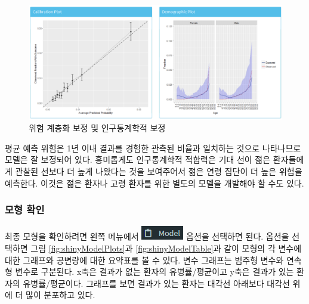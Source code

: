 \documentclass[11pt]{book}
\theoremstyle{definition}
\theoremstyle{definition}
\theoremstyle{definition}
\theoremstyle{remark}
\begin{document}
\begin{figure}

{\centering \includegraphics[width=1\linewidth]{images/PatientLevelPrediction/shiny/shinyPerformanceCal} 

}

\caption{위험 계층화 보정 및 인구통계학적 보정}\label{fig:shinyPerformanceCal}
\end{figure}

평균 예측 위험은 1년 이내 결과를 경험한 관측된 비율과 일치하는 것으로
나타나므로 모델은 잘 보정되어 있다. 흥미롭게도 인구통계학적 적합력은
기대 선이 젊은 환자들에게 관찰된 선보다 더 높게 나왔다는 것을 보여주어서
젊은 연령 집단이 더 높은 위험을 예측한다. 이것은 젊은 환자나 고령 환자를
위한 별도의 모델을 개발해야 할 수도 있다.

\subsubsection*{모형 확인}\label{-}

최종 모형을 확인하려면 왼쪽 메뉴에서
\includegraphics{images/PatientLevelPrediction/modelButton.png} 옵션을
선택하면 된다. 옵션을 선택하면 그림 \ref{fig:shinyModelPlots}과
\ref{fig:shinyModelTable}과 같이 모형의 각 변수에 대한 그래프와 공변량에
대한 요약표를 볼 수 있다. 변수 그래프는 범주형 변수와 연속형 변수로
구분된다. x축은 결과가 없는 환자의 유병률/평균이고 y축은 결과가 있는
환자의 유병률/평균이다. 그래프를 보면 결과가 있는 환자는 대각선 아래보다
대각선 위에 더 많이 분포하고 있다.
\end{document}
